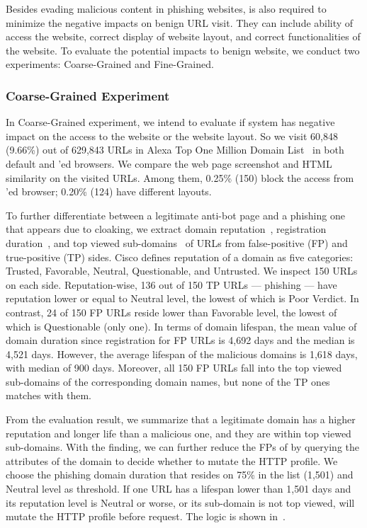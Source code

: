 Besides evading malicious content in phishing websites, \spartacus is also required to minimize the negative impacts on benign URL visit.
They can include ability of access the website, correct display of website layout, and correct functionalities of the website.
To evaluate the potential impacts to benign website, we conduct two experiments: Coarse-Grained and Fine-Grained.

\subsubsection{Coarse-Grained Experiment}

In Coarse-Grained experiment, we intend to evaluate if \spartacus system has negative impact on the access to the website or the website layout.
So we visit 60,848 (9.66\%) out of 629,843 URLs in Alexa Top One Million Domain List~\cite{AlexaTop1M} in both default and \spartacus'ed browsers.
We compare the web page screenshot and HTML similarity on the visited URLs.
Among them, 0.25\% (150) block the access from \spartacus'ed browser;
0.20\% (124) have different layouts.

To further differentiate between a legitimate anti-bot page and a phishing one that appears due to cloaking,
we extract domain reputation~\cite{reputation}, registration duration~\cite{whois}, and top viewed sub-domains~\cite{topviewedsubdomains} of URLs from false-positive (FP) and true-positive (TP) sides.
Cisco defines reputation of a domain as five categories: Trusted, Favorable, Neutral, Questionable, and Untrusted.
We inspect 150 URLs on each side.
Reputation-wise, 136 out of 150 TP URLs --- phishing --- have reputation lower or equal to Neutral level, the lowest of which is Poor Verdict.
In contrast, 24 of 150 FP URLs reside lower than Favorable level, the lowest of which is Questionable (only one).
In terms of domain lifespan, the mean value of domain duration since registration for FP URLs is 4,692 days and the median is 4,521 days.
However, the average lifespan of the malicious domains is 1,618 days, with median of 900 days.
Moreover, all 150 FP URLs fall into the top viewed sub-domains of the corresponding domain names, but none of the TP ones matches with them.

From the evaluation result, we summarize that a legitimate domain has a higher reputation and longer life than a malicious one, and they are within top viewed sub-domains.
With the finding, we can further reduce the FPs of \spartacus by querying the attributes of the domain to decide whether to mutate the HTTP profile.
We choose the phishing domain duration that resides on 75\% in the list (1,501) and Neutral level as threshold.
If one URL has a lifespan lower than 1,501 days and its reputation level is Neutral or worse, or its sub-domain is not top viewed, \spartacus will mutate the HTTP profile before request.
The logic is shown in~.

